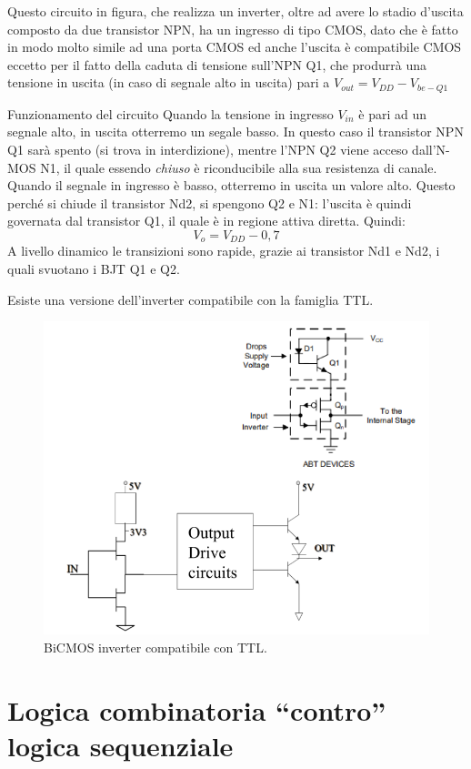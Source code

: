 \documentclass[
]{book}
\begin{document}
Questo circuito in figura, che realizza un inverter, oltre ad avere lo
stadio d'uscita composto da due transistor NPN, ha un ingresso di tipo
CMOS, dato che è fatto in modo molto simile ad una porta CMOS ed anche
l'uscita è compatibile CMOS eccetto per il fatto della caduta di
tensione sull'NPN Q1, che produrrà una tensione in uscita (in caso di
segnale alto in uscita) pari a \(V_{out}=V_{DD}-V_{be-Q1}\)

\begin{redbox}{Funzionamento del circuito}
Quando la tensione in ingresso $V_{in}$ è pari ad un segnale alto, in uscita otterremo un segale basso. In questo caso il transistor NPN Q1 sarà spento (si trova in interdizione), mentre l'NPN Q2 viene acceso dall'N-MOS N1, il quale essendo \emph{chiuso} è riconducibile alla sua resistenza di canale.
\newline
Quando il segnale in ingresso è basso, otterremo in uscita un valore alto. Questo perché si chiude il transistor Nd2, si spengono Q2 e N1: l'uscita è quindi governata dal transistor Q1, il quale è in regione attiva diretta. Quindi:
$$
V_{o}=V_{DD}-0,7
$$
A livello dinamico le transizioni sono rapide, grazie ai transistor Nd1 e Nd2, i quali svuotano i BJT Q1 e Q2.
\end{redbox}

Esiste una versione dell'inverter compatibile con la famiglia TTL.

\begin{figure}
\centering
\includegraphics[width=0.5\linewidth,height=\textheight,keepaspectratio]{assets/imgs/bicmos_ttl_inverter.png}
\caption{BiCMOS inverter compatibile con TTL.}
\end{figure}

\chapter{Logica combinatoria ``contro'' logica
sequenziale}\label{logica-combinatoria-contro-logica-sequenziale}
\end{document}
